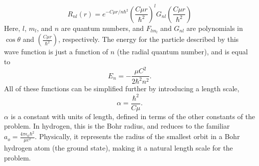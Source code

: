 \documentclass[12pt,twoside]{reedthesis}
\newcommand{\eqn}[1]{\begin{equation}#1\end{equation}}
\begin{document}
\eqn{
R_{n l}(r) = e^{-C \mu r / n \hbar^2}\left(\frac{C \mu r}{\hbar^2}\right)^{l} G_{n l}\left(\frac{C \mu r}{\hbar^2}\right)
}
Here, $l$, $m_l$, and $n$ are quantum numbers, and $F_{l m_l}$ and $G_{n l}$ are polynomials in $\cos{\theta}$ and $\left(\frac{C \mu r}{\hbar^2} \right)$, respectively. The energy for the particle described by this wave function is just a function of $n$ (the radial quantum number), and is equal to
\eqn{
E_n = -\frac{\mu C^2}{2\hbar^2 n^2}\mbox{.}
}
All of these functions can be simplified further by introducing a length scale, 
\eqn{
\alpha = \frac{\hbar^2}{C \mu}\mbox{.}
\label{eq:bohrradius}
}
$\alpha$ is a constant with units of length, defined in terms of the other constants of the problem. In hydrogen, this is the Bohr radius, and reduces to the familiar $a_o = \frac{4\pi \epsilon_0 \hbar^2}{\mu e^2}$. Physically, it represents the radius of the smallest orbit in a Bohr hydrogen atom (the ground state), making it a natural length scale for the problem.
\end{document}
